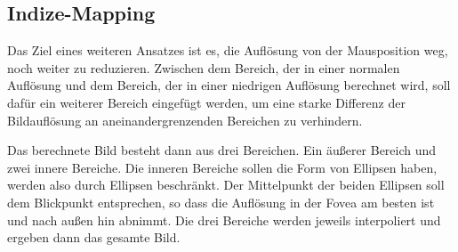 \subsection{Indize-Mapping}\label{ss::DDC}
Das Ziel eines weiteren Ansatzes ist es, die Auflösung von der Mausposition weg, noch weiter zu reduzieren.
Zwischen dem Bereich, der in einer normalen Auflösung und dem Bereich, der in einer niedrigen Auflösung berechnet wird, soll dafür ein weiterer Bereich eingefügt werden, um eine starke Differenz der Bildauflösung an aneinandergrenzenden Bereichen zu verhindern.

Das berechnete Bild besteht dann aus drei Bereichen.
Ein äußerer Bereich und zwei innere Bereiche.
Die inneren Bereiche sollen die Form von Ellipsen haben, werden also durch Ellipsen beschränkt.
Der Mittelpunkt der beiden Ellipsen soll dem Blickpunkt entsprechen, so dass die Auflösung in der Fovea am besten ist und nach außen hin abnimmt.
Die drei Bereiche werden jeweils interpoliert und ergeben dann das gesamte Bild.

